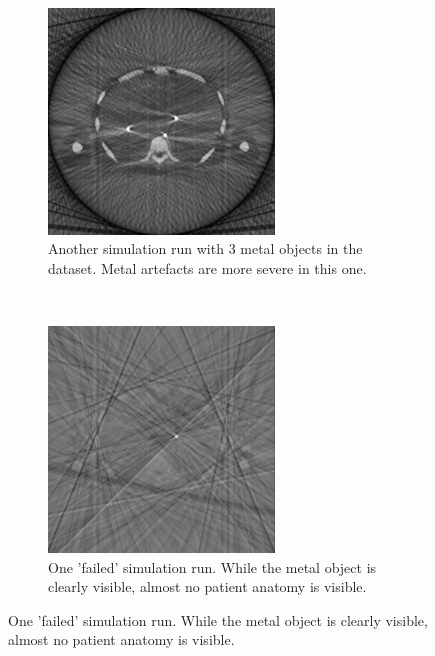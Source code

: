 \begin{figure}[h!]
	\centering	
	\begin{subfigure}[h]{0.45\textwidth}
		\centering
		\includegraphics[height=6cm]{images/sim03.png}
		\caption{Another simulation run with 3 metal objects in the dataset. Metal artefacts are more severe in this one.}
		\label{sim03}
	\end{subfigure}%
	~
	\begin{subfigure}[h]{0.45\textwidth}
		\centering
		\includegraphics[height=6cm]{images/sim04.png}
		\caption{One 'failed' simulation run. While the metal object is clearly visible, almost no patient anatomy is visible.}
		\label{sim04}
	\end{subfigure}%
\end{figure}

